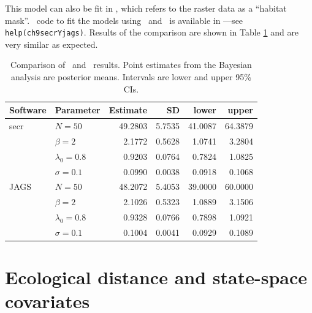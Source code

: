 This model can also be fit in \secr, which refers
to the raster data as a ``habitat mask''. \R~code to
fit the models using \secr~and \jags~is available in \scrbook---see
\verb#help(ch9secrYjags)#. Results of the
comparison are shown in Table \ref{ch9:tab:secrYjags} and are
very similar as expected. 

\begin{table}[h!]
\centering
\caption{Comparison of \secr~and \jags~results. Point estimates from
  the Bayesian analysis are posterior means. Intervals are lower and
  upper 95\% CIs.}
\begin{tabular}{llrrrr}
\hline
Software & Parameter & Estimate & SD & lower & upper \\
\hline
 secr & $N=50$ & 49.2803 & 5.7535 & 41.0087 & 64.3879 \\
      & $\beta=2$ &  2.1772 & 0.5628 &  1.0741 &  3.2804 \\
      & $\lambda_0=0.8$ &  0.9203 & 0.0764 &  0.7824 &  1.0825 \\
      & $\sigma=0.1$ &  0.0990 & 0.0038 &  0.0918 &  0.1068 \\
\hline
 JAGS & $N=50$ & 48.2072 & 5.4053 & 39.0000 & 60.0000 \\
      & $\beta=2$ &  2.1026 & 0.5323 &  1.0889 &  3.1506 \\
      & $\lambda_0=0.8$ &  0.9328 & 0.0766 &  0.7898 &  1.0921 \\
      & $\sigma=0.1$ &  0.1004 & 0.0041 &  0.0929 &  0.1089 \\
\hline
\end{tabular}
\label{ch9:tab:secrYjags}
\end{table}


\section{Ecological distance and state-space covariates}

